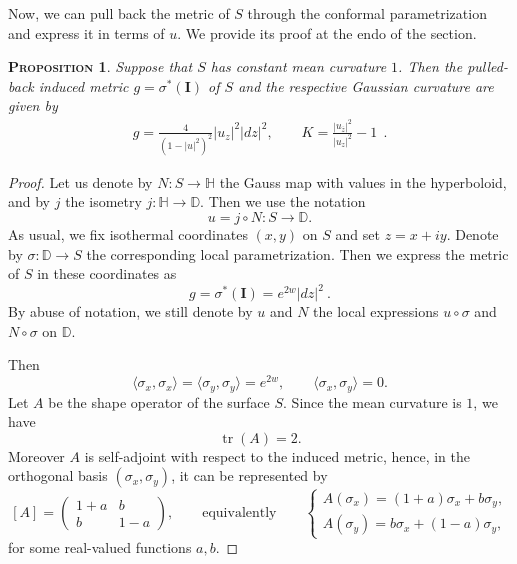 \documentclass[a4paper,11pt,openright,twoside]{book}
\newcommand{\tr}{\operatorname{tr}}
\newcommand{\I}{\mathbf{I}}
\newcommand{\1}{\mathds{1}}
\theoremstyle{plain}
\newtheorem{prop}[thm]{\textsc{Proposition}}
\theoremstyle{definition}
\theoremstyle{remark}
\begin{document}
Now, we can pull back the metric of $S$ through the  conformal parametrization and express it in terms of  $u$. We provide its proof at the endo of the section.
\begin{prop}\label{pr:indmetr}
	Suppose that $S$ has constant mean curvature $1$. Then the pulled-back induced metric $g=\sigma^*(\I)$ of $S$ and the respective Gaussian curvature are given by
	\begin{align*}
		g = \frac{4}{(1-|u|^2)^2}|u_z|^2 |dz|^2, \qquad K = \frac{|u_{\overline z}|^2}{|u_z|^2} - 1
	\ \ .
	\end{align*}
\end{prop}
\begin{proof}
Let us denote by $N:S\to \mathbb H$ the Gauss map with values in the hyperboloid, and by $j$ the isometry $j:\mathbb{H}\to \mathbb{D}$. Then we use the notation
\[
u=j\circ N:S\to \mathbb D.
\]
As usual, we fix isothermal coordinates $(x,y)$ on $S$ and set $z=x+iy$. Denote by $\sigma:\mathbb{D}\to S$ the corresponding local parametrization. Then we express the metric of $S$ in these coordinates as 
\begin{equation}\label{eq:metric-local}
g=\sigma^*(\I)=e^{2w}|dz|^2\ .
\end{equation}
By abuse of notation, we still denote by $u$ and $N$ the local expressions $u\circ \sigma$ and $N\circ \sigma$ on $\mathbb D$.

Then
\begin{equation}\label{eq:sigma-conformal}
\langle \sigma_x,\sigma_x\rangle=\langle \sigma_y,\sigma_y\rangle=e^{2w},
\qquad
\langle \sigma_x,\sigma_y\rangle=0.
\end{equation}
Let $A$ be the shape operator of the surface $S$. Since the mean curvature is $1$, we have
\[
\tr(A)=2.
\]
Moreover $A$ is self-adjoint with respect to the induced metric, hence, in the orthogonal basis $(\sigma_x,\sigma_y)$, it can be represented by
\begin{equation}\label{eq:A-matrix}
[A] = \begin{pmatrix} 1+a & b \\ b &1-a \end{pmatrix}, 
\qquad\text{equivalently}\qquad 
\begin{cases}
A(\sigma_x)=(1+a)\sigma_x+b\sigma_y,\\
A(\sigma_y)=b\sigma_x+(1-a)\sigma_y,
\end{cases}
\end{equation}
for some real-valued functions $a,b$.


\end{proof}
\end{document}
